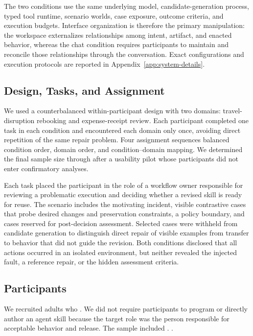 The two conditions use the same underlying model, candidate-generation
process, typed tool runtime, scenario worlds, case exposure, outcome criteria,
and execution budgets. Interface organization is therefore the primary
manipulation: the workspace externalizes relationships among intent, artifact,
and enacted behavior, whereas the chat condition requires participants to
maintain and reconcile those relationships through the conversation. Exact
configurations and execution protocols are reported in
Appendix~\ref{app:system-details}.

\subsection{Design, Tasks, and Assignment}

We used a counterbalanced within-participant design with two domains:
travel-disruption rebooking and expense-receipt review. Each participant
completed one task in each condition and encountered each domain only once,
avoiding direct repetition of the same repair problem. Four assignment
sequences balanced condition order, domain order, and condition--domain
mapping. We determined the final sample size through
 after a usability pilot whose participants did not
enter confirmatory analyses.

Each task placed the participant in the role of a workflow owner responsible
for reviewing a problematic execution and deciding whether a revised skill is
ready for reuse. The scenario includes the motivating incident, visible
contrastive cases that probe desired changes and preservation constraints, a
policy boundary, and cases reserved for post-decision assessment. Selected
cases were withheld from candidate generation to distinguish direct repair of
visible examples from transfer to behavior that did not guide the revision.
Both conditions disclosed that all actions occurred in an isolated
environment, but neither revealed the injected fault, a reference repair, or
the hidden assessment criteria.

\subsection{Participants}

We recruited \StudyN{} adults who
. We did not require
participants to program or directly author an agent skill because the target
role was the person responsible for acceptable behavior and release. The
sample included . .

